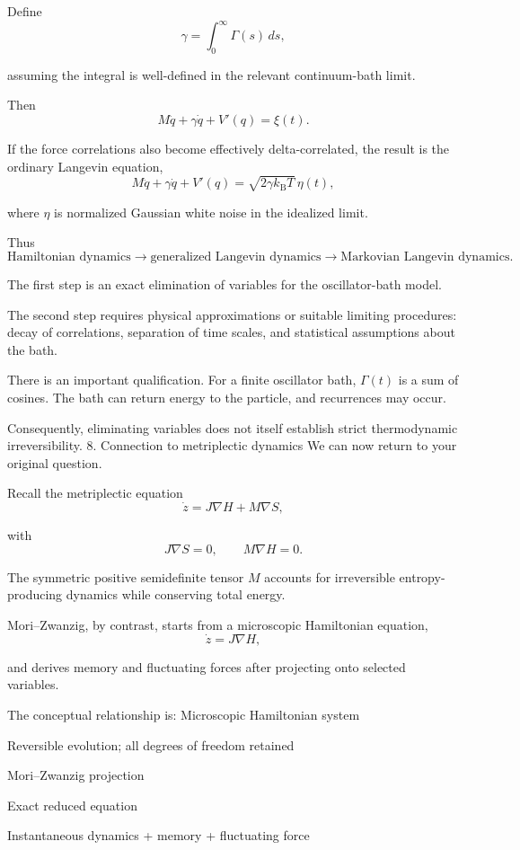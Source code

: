 Define
\[
\gamma=\int_0^\infty\Gamma(s)\,ds,
\]

assuming the integral is well-defined in the relevant continuum-bath limit.

Then
\[
M\ddot q+\gamma\dot q+V'(q)=\xi(t).
\]

If the force correlations also become effectively delta-correlated, the result is the ordinary Langevin equation,
\[
\boxed{
M\ddot q+\gamma\dot q+V'(q)
=
\sqrt{2\gamma k_{\mathrm B}T}\,\eta(t),
}
\]

where \(\eta\) is normalized Gaussian white noise in the idealized limit.

Thus
\[
\text{Hamiltonian dynamics}
\longrightarrow
\text{generalized Langevin dynamics}
\longrightarrow
\text{Markovian Langevin dynamics}.
\]

The first step is an exact elimination of variables for the oscillator-bath model.

The second step requires physical approximations or suitable limiting procedures: decay of correlations, separation of time scales, and statistical assumptions about the bath.

There is an important qualification. For a finite oscillator bath, \(\Gamma(t)\) is a sum of cosines. The bath can return energy to the particle, and recurrences may occur.

Consequently, eliminating variables does not itself establish strict thermodynamic irreversibility.
8. Connection to metriplectic dynamics
We can now return to your original question.

Recall the metriplectic equation
\[
\dot z
=
J\nabla H+M\nabla S,
\]

with
\[
J\nabla S=0,\qquad M\nabla H=0.
\]

The symmetric positive semidefinite tensor \(M\) accounts for irreversible entropy-producing dynamics while conserving total energy.

Mori–Zwanzig, by contrast, starts from a microscopic Hamiltonian equation,
\[
\dot z=J\nabla H,
\]

and derives memory and fluctuating forces after projecting onto selected variables.

The conceptual relationship is:
Microscopic Hamiltonian system

Reversible evolution; all degrees of freedom retained

Mori–Zwanzig projection

Exact reduced equation

Instantaneous dynamics + memory + fluctuating force

